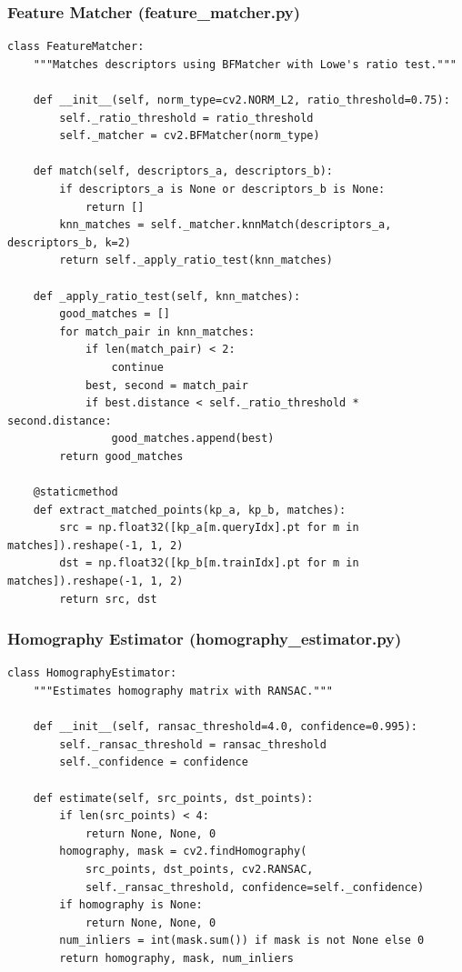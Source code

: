 \documentclass[a4paper,12pt]{article}
\begin{document}
\subsubsection*{Feature Matcher (feature\_matcher.py)}
\begin{lstlisting}
class FeatureMatcher:
    """Matches descriptors using BFMatcher with Lowe's ratio test."""

    def __init__(self, norm_type=cv2.NORM_L2, ratio_threshold=0.75):
        self._ratio_threshold = ratio_threshold
        self._matcher = cv2.BFMatcher(norm_type)

    def match(self, descriptors_a, descriptors_b):
        if descriptors_a is None or descriptors_b is None:
            return []
        knn_matches = self._matcher.knnMatch(descriptors_a, descriptors_b, k=2)
        return self._apply_ratio_test(knn_matches)

    def _apply_ratio_test(self, knn_matches):
        good_matches = []
        for match_pair in knn_matches:
            if len(match_pair) < 2:
                continue
            best, second = match_pair
            if best.distance < self._ratio_threshold * second.distance:
                good_matches.append(best)
        return good_matches

    @staticmethod
    def extract_matched_points(kp_a, kp_b, matches):
        src = np.float32([kp_a[m.queryIdx].pt for m in matches]).reshape(-1, 1, 2)
        dst = np.float32([kp_b[m.trainIdx].pt for m in matches]).reshape(-1, 1, 2)
        return src, dst
\end{lstlisting}

\subsubsection*{Homography Estimator (homography\_estimator.py)}
\begin{lstlisting}
class HomographyEstimator:
    """Estimates homography matrix with RANSAC."""

    def __init__(self, ransac_threshold=4.0, confidence=0.995):
        self._ransac_threshold = ransac_threshold
        self._confidence = confidence

    def estimate(self, src_points, dst_points):
        if len(src_points) < 4:
            return None, None, 0
        homography, mask = cv2.findHomography(
            src_points, dst_points, cv2.RANSAC,
            self._ransac_threshold, confidence=self._confidence)
        if homography is None:
            return None, None, 0
        num_inliers = int(mask.sum()) if mask is not None else 0
        return homography, mask, num_inliers
\end{lstlisting}
\end{document}
